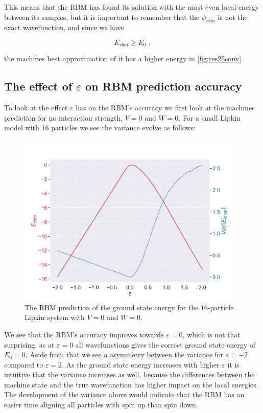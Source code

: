 This means that the RBM has found its solution with the most even local energy between its samples, but it is important to remember that the $\psi_{rbm}$ is not the exact wavefunction, and since we have

$$E_{rbm} \geq E_0 \; ,$$

the machines best approximation of it has a higher energy in \ref{fig:res25conv}.

\subsection{The effect of \texorpdfstring{$\varepsilon$}{epsilon} on RBM prediction accuracy}

To look at the effect $\varepsilon$ has on the RBM's accuracy we first look at the machines prediction for no interaction strength, $V=0$ and $W=0$. For a small Lipkin model with $16$ particles we see the variance evolve as follows:

\begin{figure}[H]
  \begin{center}
    \includegraphics[width=0.95\textwidth]{Figures/Plots/Lipkin/[eps][-2.0-2.0][e=500][n=16][V=0][W=0]}
  \end{center}
  \caption{The RBM prediction of the ground state energy for the $16$-particle Lipkin system with $V=0$ and $W=0$.}
\end{figure}

We see that the RBM's accuracy improves towards $\varepsilon=0$, which is not that surprising, as at $\varepsilon = 0$ all wavefunctions gives the correct ground state energy of $E_0 = 0$. Aside from that we see a asymmetry between the variance for $\varepsilon = -2$ compared to $\varepsilon = 2$. As the ground state energy increases with higher $\varepsilon$ it is intuitive that the variance increases as well, because the differences between the machine state and the true wavefunction has higher impact on the local energies. The development of the variance above would indicate that the RBM has an easier time aligning all particles with spin up than spin down. 

